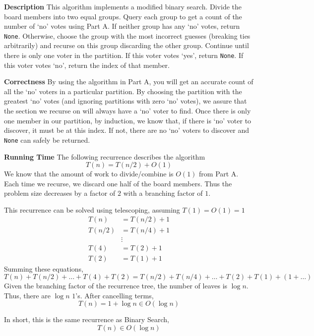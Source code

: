 \documentclass[12pt,twoside]{article}
\begin{document}
\begin{problems}
\begin{problemparts}
\problempart %

\textbf{Description} This algorithm implements a modified binary search. Divide
the board members into two equal groups. Query each group to get a count of the
number of `no' votes using Part A. If neither group has any `no' votes, return 
\texttt{None}. Otherwise, choose the group with the most incorrect guesses 
(breaking ties arbitrarily) and recurse on this group discarding the other 
group. Continue until there is only one voter in the partition. If this voter
votes `yes', return \texttt{None}. If this voter votes `no', return the index
of that member.

\textbf{Correctness} By using the algorithm in Part A, you will get an accurate
count of all the `no' voters in a particular partition. By choosing the
partition with the greatest `no' votes (and ignoring partitions with zero `no'
votes), we assure that the section we recurse on will always have a `no' voter
to find. Once there is only one member in our partition, by induction, we know
that, if there is `no' voter to discover, it must be at this index. If not,
there are no `no' voters to discover and \texttt{None} can safely be returned.

\textbf{Running Time} The following recurrence describes the algorithm
$$ T(n) = T(n/2) + O(1) $$
We know that the amount of work to divide/combine is $O(1)$ from Part A. Each
time we recurse, we discard one half of the board members. Thus the problem
size decreases by a factor of $2$ with a branching factor of $1$. 

This recurrence can be solved using telescoping, assuming $T(1) = O(1) = 1$
\begin{align*}
    T(n) &= T(n / 2) + 1 \\
    T(n / 2) &= T(n / 4) + 1 \\
    &\vdots \\
    T(4) &= T(2) + 1 \\
    T(2) &= T(1) + 1
\end{align*}
Summing these equations,
$$ T(n) + T(n / 2) + \ldots + T(4) + T(2) = T(n / 2) + T(n / 4) + \ldots +
T(2) + T(1) + (1 + \ldots) $$
Given the branching factor of the recurrence tree, the number of leaves is
$\log n$. Thus, there are $\log n$ $1$'s. After cancelling terms,
$$ T(n) = 1 + \log n \in O(\log n)$$

In short, this is the same recurrence as Binary Search,
$$ T(n) \in O(\log n) $$

\problempart %


\end{problemparts}
\end{problems}
\end{document}
